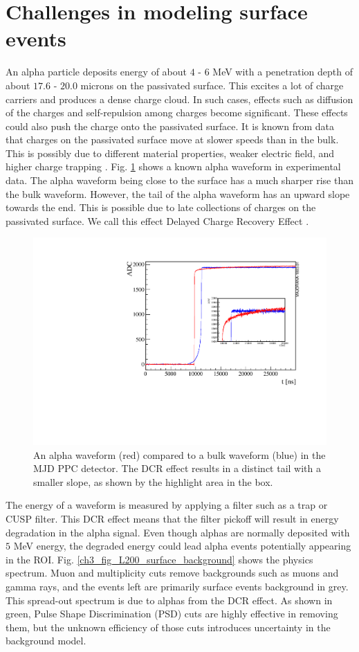 \section{Challenges in modeling surface events}
An alpha particle deposits energy of about $4$ - $6$ MeV with a penetration depth of about $17.6$ - $20.0$ microns on the passivated surface. This excites a lot of charge carriers and produces a dense charge cloud. In such cases, effects such as diffusion of the charges and self-repulsion among charges become significant. These effects could also push the charge onto the passivated surface. It is known from data that charges on the passivated surface move at slower speeds than in the bulk. This is possibly due to different material properties, weaker electric field, and higher charge trapping \cite{MULLOWNEY201233}. Fig. \ref{fig:dcr_waveform} shows a known alpha waveform in experimental data. The alpha waveform being close to the surface has a much sharper rise than the bulk waveform. However, the tail of the alpha waveform has an upward slope towards the end. This is possible due to late collections of charges on the passivated surface. We call this effect Delayed Charge Recovery Effect \cite{Gruszko:2017kfx}.

  \begin{figure}[!htb]
\centering
  \includegraphics[width=0.8\linewidth]{ch3/figs/dcr_waveform.pdf}
 \caption{An alpha waveform (red) compared to a bulk waveform (blue) in the MJD PPC detector. The DCR effect results in a distinct tail with a smaller slope, as shown by the highlight area in the box.\cite{tube_paper}}
\label{fig:dcr_waveform}
  \end{figure}

The energy of a waveform is measured by applying a filter such as a trap or CUSP filter. This DCR effect means that the filter pickoff will result in energy degradation in the alpha signal. Even though alphas are normally deposited with $5$ MeV energy, the degraded energy could lead alpha events potentially appearing in the ROI. Fig. \ref{ch3_fig_L200_surface_background} shows the {\Ltwo} physics spectrum. Muon and multiplicity cuts remove backgrounds such as muons and gamma rays, and the events left are primarily surface events background in grey. This spread-out spectrum is due to alphas from the DCR effect. As shown in green, Pulse Shape Discrimination (PSD) cuts are highly effective in removing them, but the unknown efficiency of those cuts introduces uncertainty in the background model. 

